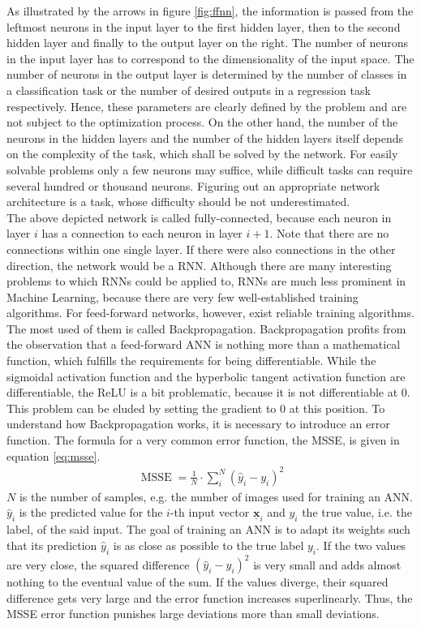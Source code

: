 \documentclass[11pt, a4paper]{article}
\newcommand\V[1]{\ensuremath{\underline{\mathbf{#1}}}}
\begin{document}
As illustrated by the arrows in figure \ref{fig:ffnn}, the information is passed from the leftmost neurons in the input layer to the first hidden layer, then to the second hidden layer and finally to the output layer on the right. The number of neurons in the input layer has to correspond to the dimensionality of the input space. The number of neurons in the output layer is determined by the number of classes in a classification task or the number of desired outputs in a regression task respectively. Hence, these parameters are clearly defined by the problem and are not subject to the optimization process. On the other hand, the number of the neurons in the hidden layers and the number of the hidden layers itself depends on the complexity of the task, which shall be solved by the network. For easily solvable problems only a few neurons may suffice, while difficult tasks can require several hundred or thousand neurons. Figuring out an appropriate network architecture is a task, whose difficulty should be not underestimated.\\
The above depicted network is called fully-connected, because each neuron in layer $i$ has a connection to each neuron in layer $i + 1$. Note that there are no connections within one single layer. If there were also connections in the other direction, the network would be a \ac{RNN}. Although there are many interesting problems to which \acp{RNN} could be applied to, \acp{RNN} are much less prominent in Machine Learning, because there are very few well-established training algorithms. For feed-forward networks, however, exist reliable training algorithms. The most used of them is called Backpropagation. Backpropagation profits from the observation that a feed-forward \ac{ANN} is nothing more than a mathematical function, which fulfills the requirements for being differentiable. While the sigmoidal activation function and the hyperbolic tangent activation function are differentiable, the \ac{ReLU} is a bit problematic, because it is not differentiable at $0$. This problem can be eluded by setting the gradient to $0$ at this position. To understand how Backpropagation works, it is necessary to introduce an error function. The formula for a very common error function, the \ac{MSSE}, is given in equation \eqref{eq:msse}.
\begin{align}
\label{eq:msse}
\operatorname{MSSE} = \frac{1}{N} \cdot \sum_{i}^{N} \left(\hat{y}_i - y_i\right)^2
\end{align}
$N$ is the number of samples, e.g. the number of images used for training an \ac{ANN}. $\hat{y}_i$ is the predicted value for the $i$-th input vector $\V{x}_i$ and $y_i$ the true value, i.e. the label, of the said input. The goal of training an \ac{ANN} is to adapt its weights such that its prediction $\hat{y}_i$ is as close as possible to the true label $y_i$. If the two values are very close, the squared difference $(\hat{y}_i - y_i)^2$ is very small and adds almost nothing to the eventual value of the sum. If the values diverge, their squared difference gets very large and the error function increases superlinearly. Thus, the \ac{MSSE} error function punishes large deviations more than small deviations.\\
\end{document}
